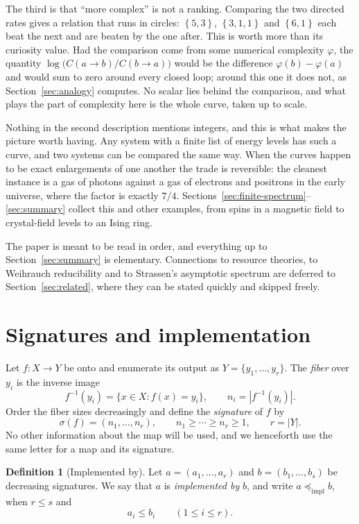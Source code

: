 \documentclass[11pt]{article}
\theoremstyle{definition}
\newtheorem{definition}{Definition}
\theoremstyle{remark}
\newcommand{\sig}[1]{\left\{#1\right\}}
\newcommand{\impl}{\preccurlyeq_{\mathrm{impl}}}
\begin{document}
The third is that ``more complex'' is not a ranking.  Comparing the two
directed rates gives a relation that runs in circles: \(\sig{5,3}\),
\(\sig{3,1,1}\) and \(\sig{6,1}\) each beat the next and are beaten by the
one after.  This is worth more than its curiosity value.  Had the comparison
come from some numerical complexity \(\varphi\), the quantity
\(\log\bigl(C(a\to b)/C(b\to a)\bigr)\) would be the difference
\(\varphi(b)-\varphi(a)\) and would sum to zero around every closed loop;
around this one it does not, as Section~\ref{sec:analogy} computes.  No scalar
lies behind the comparison, and what plays the part of complexity here is the
whole curve, taken up to scale.

Nothing in the second description mentions integers, and this is what makes
the picture worth having.  Any system with a finite list of energy levels has
such a curve, and two systems can be compared the same way.  When the curves
happen to be exact enlargements of one another the trade is reversible: the
cleanest instance is a gas of photons against a gas of electrons and
positrons in the early universe, where the factor is exactly \(7/4\).
Sections~\ref{sec:finite-spectrum}--\ref{sec:summary} collect this and other
examples, from spins in a magnetic field to crystal-field levels to an Ising
ring.

The paper is meant to be read in order, and everything up to
Section~\ref{sec:summary} is elementary.  Connections to resource theories,
to Weihrauch reducibility and to Strassen's asymptotic spectrum are deferred
to Section~\ref{sec:related}, where they can be stated quickly and skipped
freely.

\section{Signatures and implementation}
\label{sec:signatures}

Let \(f:X\to Y\) be onto and enumerate its output as
\(Y=\{y_1,\ldots,y_r\}\).  The \emph{fiber} over \(y_i\) is the inverse image
\[
  f^{-1}(y_i)=\{x\in X:f(x)=y_i\},
  \qquad n_i=\left|f^{-1}(y_i)\right|.
\]
Order the fiber sizes decreasingly and define the \emph{signature} of \(f\) by
\[
  \sigma(f)=(n_1,\ldots,n_r),\qquad
  n_1\geq\cdots\geq n_r\geq 1,\qquad r=|Y|.
\]
No other information about the map will be used, and we henceforth use the
same letter for a map and its signature.

\begin{definition}[Implemented by]
Let \(a=(a_1,\ldots,a_r)\) and \(b=(b_1,\ldots,b_s)\) be decreasing
signatures.  We say that \(a\) is \emph{implemented by} \(b\), and write
\(a\impl b\), when \(r\leq s\) and
\[
  a_i\leq b_i\qquad(1\leq i\leq r).
\]
\end{definition}
\end{document}
